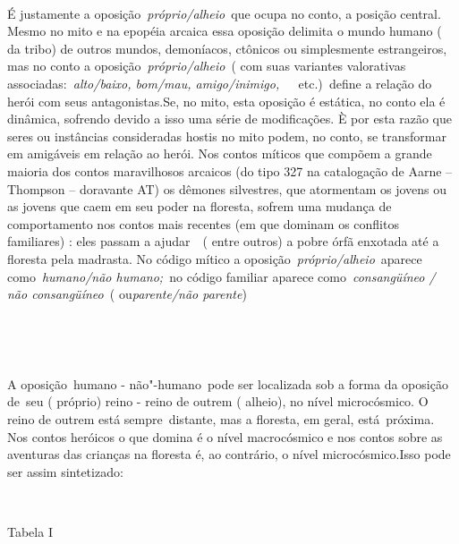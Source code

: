 ~

É justamente a oposição~\emph{próprio/alheio}~que ocupa no conto, a
posição central. Mesmo no mito e na epopéia arcaica essa oposição
delimita o mundo humano ( da tribo) de outros mundos, demoníacos,
ctônicos ou simplesmente estrangeiros, mas no conto a
oposição~\emph{próprio/alheio}~( com suas variantes valorativas
associadas:~\emph{alto/baixo, bom/mau,
amigo/inimigo,~~}~etc.)\emph{~}define a relação do herói com seus
antagonistas.Se, no mito, esta oposição é estática, no conto ela é
dinâmica, sofrendo devido a isso uma série de modificações. È por esta
razão que seres ou instâncias consideradas hostis no mito podem, no
conto, se transformar em amigáveis em relação ao herói. Nos contos
míticos que compõem a grande maioria dos contos maravilhosos arcaicos
(do tipo 327 na catalogação de Aarne --Thompson -- doravante AT) os
dêmones silvestres, que atormentam os jovens ou as jovens que caem em
seu poder na floresta, sofrem uma mudança de comportamento nos contos
mais recentes (em que dominam os conflitos familiares) : eles passam a
ajudar~~( entre outros) a pobre órfã enxotada até a floresta pela
madrasta. No código mítico a oposição~\emph{próprio/alheio}~aparece
como~\emph{humano/não humano;~}no código familiar aparece
como~\emph{consangüíneo / não consangüíneo~}( ou\emph{parente/não
parente})

~

~

A oposição~{humano - não"-humano}~pode ser localizada sob a forma da
oposição de~{seu ( próprio) reino - reino de outrem ( alheio)}, no nível
microcósmico. O reino de outrem está sempre~{distante}, mas a floresta,
em geral, está~{próxima}. Nos contos heróicos o que domina é o nível
macrocósmico e nos contos sobre as aventuras das crianças na floresta é,
ao contrário, o nível microcósmico.Isso pode ser assim sintetizado:

~

Tabela I

%
%
%
%
~

